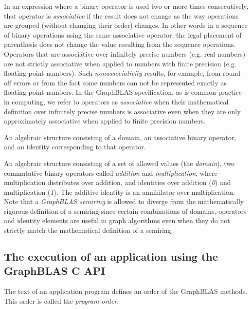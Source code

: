  In an expression where a binary operator is used two or more times consecutively, that operator is 
\emph{associative} if the result does not change as the way operations are grouped (without changing their order) changes. In other
words in a sequence of binary operations using the same associative operator, the legal placement of parenthesis does not change the 
value resulting from the sequence operations.  Operators that are associative over infinitely precise numbers (e.g. real numbers) are not 
strictly associative when applied to numbers with finite precision (e.g. floating point numbers). Such \emph{nonassociativity} results, for example, from 
round off errors or from the fact some numbers can not be represented exactly as floating point numbers.   In the GraphBLAS specification, 
as is common practice in computing, we refer to operators as \emph{associative} when their mathematical 
definition over infinitely precise numbers is associative even when they are only approximately associative when applied
to finite precision numbers.

 An algebraic structure consisting of a domain, an associative binary operator, and an identity corresponding to 
that operator.

 An algebraic structure consisting of a set of allowed values
(the \emph{domain}), two commutative binary operators called \emph{addition} 
and \emph{multiplication}, where multiplication distributes over addition,
and identities over addition (\emph{0}) and multiplication (\emph{1}).  The additive
identity is an annihilator over multiplication.   
Note that a \emph{GraphBLAS semiring} is allowed to diverge from the mathematically 
rigorous definition of a semiring since certain combinations of domains, operators and identity 
elements are useful in graph algorithms even when they do not strictly match the mathematical
definition of a semiring.
\glossEnd



\subsection{The execution of an application using the GraphBLAS C API}
\glossBegin
{} The text of an application program defines an order
of the GraphBLAS methods. This order is called the \emph{program order}.

